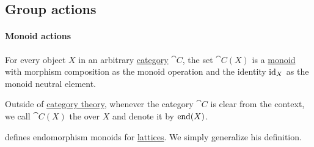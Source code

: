 \subsection{Group actions}\label{subsec:group_actions}

\paragraph{Monoid actions}

\begin{definition}\label{def:endomorphism_monoid}\mimprovised
  For every object \( X \) in an arbitrary \hyperref[def:category]{category} \( \cat{C} \), the set \( \cat{C}(X) \) is a \hyperref[def:monoid]{monoid} with morphism composition as the monoid operation and the identity \( \operatorname{id}_X \) as the monoid neutral element.

  Outside of \hyperref[sec:category_theory]{category theory}, whenever the category \( \cat{C} \) is clear from the context, we call \( \cat{C}(X) \) the  over \( X \) and denote it by \( \operatorname{end}(X) \).
\end{definition}
\begin{comments}
  \item {} defines endomorphism monoids for \hyperref[def:lattice]{lattices}. We simply generalize his definition.
\end{comments}

